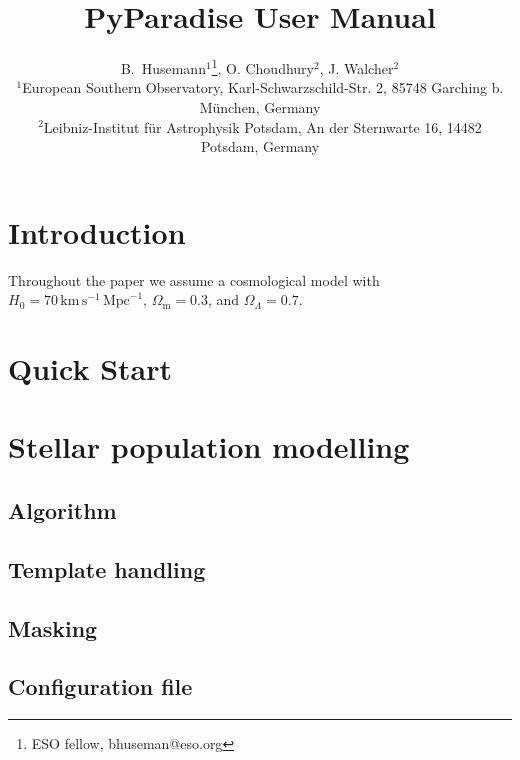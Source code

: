 \documentclass[usenatbib,usegraphicx,useAMS]{mn2e}
\begin{document}
\title{PyParadise User Manual}

\author[Husemann et al.]{B.~Husemann$^{1}$\thanks{ESO fellow, bhuseman@eso.org}, O. Choudhury$^{2}$, J. Walcher$^{2}$\newauthor\\
$^1$European Southern Observatory, Karl-Schwarzschild-Str. 2, 85748 Garching b. M\"unchen, Germany\\
$^2$Leibniz-Institut f\"ur Astrophysik Potsdam, An der Sternwarte 16, 14482 Potsdam, Germany\\
}
\maketitle
\begin{abstract}

\end{abstract}

\section{Introduction}
Throughout the paper we assume a cosmological model with 
$H_0=70\,\mathrm{km}\,\mathrm{s}^{-1}\,\mathrm{Mpc}^{-1}$, $\Omega_{\mathrm{m}}=0.3$, and $\Omega_\Lambda=0.7$.

\section{Quick Start}

\section{Stellar population modelling}
\subsection{Algorithm}
\subsection{Template handling}
\subsection{Masking}
\subsection{Configuration file}
\end{document}
